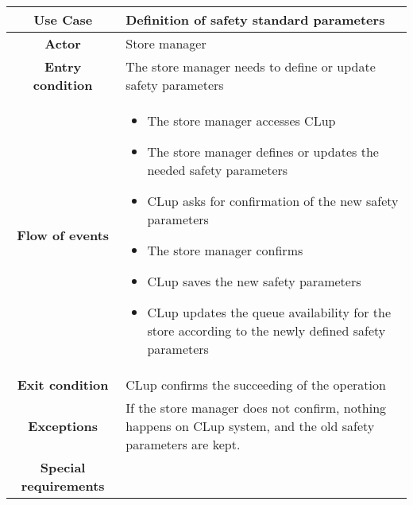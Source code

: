 \documentclass[../../main.tex]{subfiles}
\begin{document}
      \begin{table}[H]
        \centering
          \begin{tabular}{c m{}}
          \hline
          \textbf{Use Case} & Definition of safety standard parameters\\ \hline
          \textbf{Actor} & Store manager\\ \hline
          \textbf{Entry condition} & The store manager needs to define or update safety parameters \\  \hline
          \textbf{Flow of events} & \begin{itemize}
                                      \item The store manager accesses CLup
                                      \item The store manager defines or updates the needed safety parameters
                                      \item CLup asks for confirmation of the new safety parameters
                                      \item The store manager confirms
                                      \item CLup saves the new safety parameters
                                      \item CLup updates the queue availability for the store according to the newly defined safety parameters
                                    \end{itemize}\\ \hline
          \textbf{Exit condition} & CLup confirms the succeeding of the operation \\ \hline
          \textbf{Exceptions} & If the store manager does not confirm, nothing happens on CLup system, and the old safety parameters are kept.\\ \hline
          \textbf{Special requirements} &\\ \hline
          \end{tabular}
      \end{table}

\end{document}
